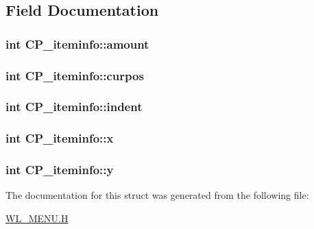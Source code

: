 \subsection{Field Documentation}
\hypertarget{structCP__iteminfo_a425e3f50bfc822512e1d5663437ac7fe}{
\subsubsection[{amount}]{\setlength{\rightskip}{0pt plus 5cm}int {\bf CP\_\-iteminfo::amount}}}
\label{structCP__iteminfo_a425e3f50bfc822512e1d5663437ac7fe}
\hypertarget{structCP__iteminfo_a97212c1213e5ee22c715d2456ac0576b}{
\subsubsection[{curpos}]{\setlength{\rightskip}{0pt plus 5cm}int {\bf CP\_\-iteminfo::curpos}}}
\label{structCP__iteminfo_a97212c1213e5ee22c715d2456ac0576b}
\hypertarget{structCP__iteminfo_aff46e6a77ece90960658a6f4f1aa0a85}{
\subsubsection[{indent}]{\setlength{\rightskip}{0pt plus 5cm}int {\bf CP\_\-iteminfo::indent}}}
\label{structCP__iteminfo_aff46e6a77ece90960658a6f4f1aa0a85}
\hypertarget{structCP__iteminfo_ad5d75e5c5716e962633166ab853669a9}{
\subsubsection[{x}]{\setlength{\rightskip}{0pt plus 5cm}int {\bf CP\_\-iteminfo::x}}}
\label{structCP__iteminfo_ad5d75e5c5716e962633166ab853669a9}
\hypertarget{structCP__iteminfo_aac807c1a16c82ec357334d091f4a01af}{
\subsubsection[{y}]{\setlength{\rightskip}{0pt plus 5cm}int {\bf CP\_\-iteminfo::y}}}
\label{structCP__iteminfo_aac807c1a16c82ec357334d091f4a01af}


The documentation for this struct was generated from the following file:\begin{DoxyCompactItemize}
\item 
\hyperlink{WL__MENU_8H}{WL\_\-MENU.H}\end{DoxyCompactItemize}
